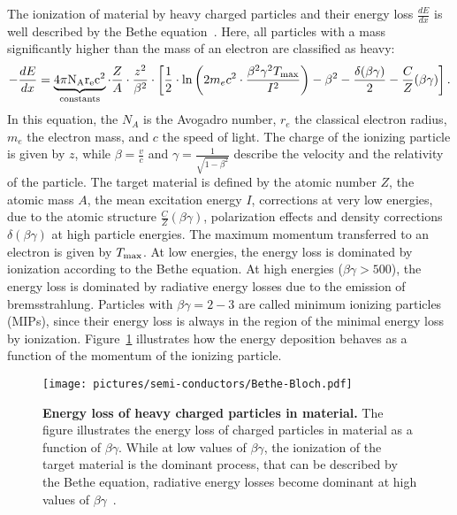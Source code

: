 The ionization of material by heavy charged particles and their energy loss $\frac{dE}{dx}$ is well described by the Bethe equation~\cite{Ber12}. Here, all particles with a mass significantly higher than the mass of an electron are classified as heavy:
\begin{equation}
-\frac{dE}{dx}=\underbrace{4\rm{\pi}N_A r_e c^2}_{\rm{constants}}\cdot \frac{Z}{A}\cdot \frac{z^2}{\beta ^2}\cdot\left[\frac{1}{2}\cdot\ln \left(2m_e c^2\cdot\frac{\beta ^2\gamma ^2T_{\rm{max}}}{I^2}\right)-\beta ^2-\frac{\delta (\beta \gamma)}{2}-\frac{C}{Z}(\beta \gamma)\right].\label{equ:Bethe-Bloch}
\end{equation}
In this equation, the $N_A$ is the Avogadro number, $r_e$ the classical electron radius, $m_e$ the electron mass, and $c$ the speed of light. The charge of the ionizing particle is given by $z$, while $\beta=\frac{v}{c}$ and $\gamma=\frac{1}{\sqrt{1-\beta^2}}$ describe the velocity and the relativity of the particle. The target material is defined by the atomic number $Z$, the atomic mass $A$, the mean excitation energy $I$, corrections at very low energies, due to the atomic structure $\frac{C}{Z}(\beta \gamma)$, polarization effects and density corrections $\delta (\beta \gamma)$ at high particle energies. The maximum momentum transferred to an electron is given by $T_{\rm{max}}$. At low energies, the energy loss is dominated by ionization according to the Bethe equation. At high energies ($\beta \gamma > 500$), the energy loss is dominated by radiative energy losses due to the emission of bremsstrahlung. Particles with $\beta \gamma =2-3$ are called minimum ionizing particles (\acs{MIP}s), since their energy loss is always in the region of the minimal energy loss by ionization. Figure~\ref{fig:Bethe-Bloch} illustrates how the energy deposition behaves as a function of the momentum of the ionizing particle.

\begin{figure}
\begin{center}
\texttt{[image: pictures/semi-conductors/Bethe-Bloch.pdf]}
\end{center}
\caption[Energy loss of charged particles in material]{\textbf{Energy loss of heavy charged particles in material.} The figure illustrates the energy loss of charged particles in material as a function of $\beta \gamma$. While at low values of $\beta \gamma$, the ionization of the target material is the dominant process, that can be described by the Bethe equation, radiative energy losses become dominant at high values of $\beta \gamma$~\cite{Ber12}.}\label{fig:Bethe-Bloch}
\end{figure}

